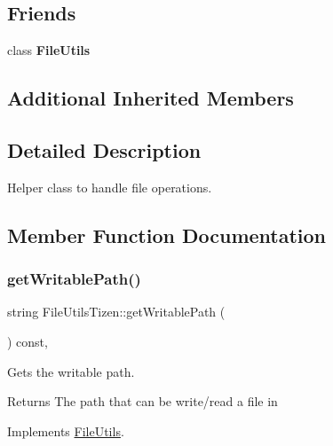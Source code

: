 \subsection*{Friends}
\begin{DoxyCompactItemize}
\item 
\mbox{\label{classFileUtilsTizen_a6dbe7ca774e78da4f740d18287a14042}} 
class {\bfseries File\+Utils}
\end{DoxyCompactItemize}
\subsection*{Additional Inherited Members}


\subsection{Detailed Description}
Helper class to handle file operations. 

\subsection{Member Function Documentation}
\mbox{\label{classFileUtilsTizen_a5ded2b60f350ec2b245c97ec48e57ffc}} 
\subsubsection{\texorpdfstring{get\+Writable\+Path()}{getWritablePath()}}
{\footnotesize\ttfamily string File\+Utils\+Tizen\+::get\+Writable\+Path (\begin{DoxyParamCaption}{ }\end{DoxyParamCaption}) const\hspace{0.3cm}{\ttfamily [override]}, {\ttfamily [virtual]}}

Gets the writable path. \begin{DoxyReturn}{Returns}
The path that can be write/read a file in 
\end{DoxyReturn}


Implements \hyperlink{classFileUtils_aab14c8d4e292f7a1e9b2b2908d02a0ed}{File\+Utils}.

\mbox{\label{classFileUtilsTizen_a3c094c5c41c9f01e31158e1c81690419}} 
